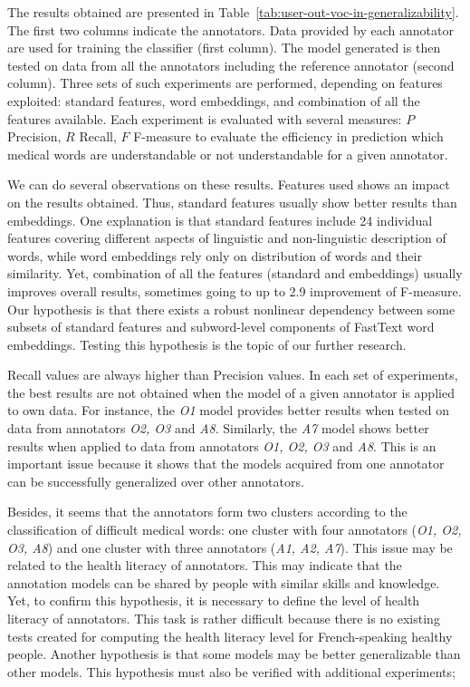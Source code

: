 The results obtained are presented in
Table~\ref{tab:user-out-voc-in-generalizability}. The first two columns indicate the
annotators.
Data provided by each annotator are used for training the classifier
(first column). The model generated is then tested on data from all
the annotators including the reference annotator (second column).
Three sets of such experiments are performed, depending on features
exploited: standard features, word embeddings, and combination of all
the features available.
Each experiment is evaluated with several measures: $P$ Precision, $R$
Recall, $F$ F-measure to evaluate the efficiency in prediction which
medical words are understandable or not understandable for a given
annotator.

We can do several observations on these results.
Features used shows an impact on the results obtained. Thus, standard
features usually show better results than embeddings. One explanation
is that standard features include 24 individual features covering
different aspects of linguistic and non-linguistic description of
words, while word embeddings rely only on distribution of words and
their similarity. Yet, combination of all the features (standard and
embeddings) usually improves overall results, sometimes going to up to
2.9 improvement of F-measure.  Our hypothesis is that there exists a
robust nonlinear dependency between some subsets of standard features
and subword-level components of FastText word embeddings. Testing this
hypothesis is the topic of our further research.

Recall values are always higher than Precision values.
In each set of experiments, the best results are not obtained when the
model of a given annotator is applied to own data. For instance, the
{\it O1} model provides better results when tested on data from
annotators {\it O2, O3} and {\it A8}.  Similarly, the {\it A7} model
shows better results when applied to data from annotators {\it O1, O2,
  O3} and {\it A8}. This is an important issue because it shows that
the models acquired from one annotator can be successfully generalized
over other annotators.

Besides, it seems that the annotators form two clusters according to
the classification of difficult medical words: one cluster with four
annotators ({\it O1, O2, O3, A8}) and one cluster with three
annotators ({\it A1, A2, A7}). This issue may be related to the health
literacy of annotators. This may indicate that the annotation models
can be shared by people with similar skills and knowledge. Yet, to
confirm this hypothesis, it is necessary to define the level of health
literacy of annotators. This task is rather difficult because there is
no existing tests created for computing the health literacy level for
French-speaking healthy people. Another hypothesis is that some models
may be better generalizable than other models. This hypothesis must
also be verified with additional experiments;

